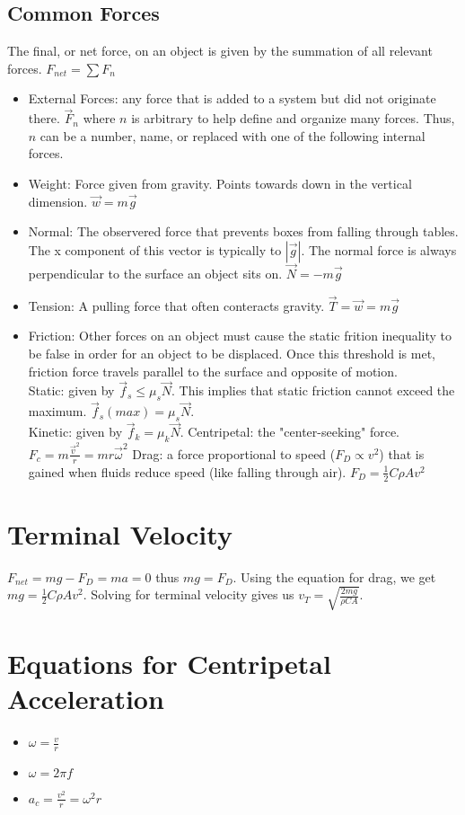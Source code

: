 \documentclass{article}
\begin{document}
\subsection{Common Forces}
The final, or net force, on an object is given by the summation of all relevant forces. $F_{net} = \sum F_n$
\begin{itemize}
  \item External Forces: any force that is added to a system but did not originate there. $\vec{F}_n$ where $n$ is arbitrary to help define and organize many forces. Thus, $n$ can be a number, name, or replaced with one of the following internal forces.
  \item Weight: Force given from gravity. Points towards down in the vertical dimension. $\vec{w} = m\vec{g}$
  \item Normal: The observered force that prevents boxes from falling through tables. The x component of this vector is typically to $|\vec{g}|$. The normal force is always perpendicular to the surface an object sits on. $\vec{N} = -m\vec{g}$
  \item Tension: A pulling force that often conteracts gravity. $\vec{T} = \vec{w} = m\vec{g}$
  \item Friction: Other forces on an object must cause the static frition inequality to be false in order for an object to be displaced. Once this threshold is met, friction force travels parallel to the surface and opposite of motion.\\
  Static: given by $\vec{f}_s \leq \mu_s\vec{N}$. This implies that static friction cannot exceed the maximum. $\vec{f}_s(max) = \mu_s\vec{N}$.\\
  Kinetic: given by $\vec{f}_k = \mu_k\vec{N}$.
  Centripetal: the "center-seeking" force. $F_c = m\frac{\vec{v}^2}{r} = mr\vec{\omega}^2$
  Drag: a force proportional to speed ($F_D \propto v^2$) that is gained when fluids reduce speed (like falling through air). $F_D = \frac{1}{2}C\rho Av^2$
\end{itemize}

\section{Terminal Velocity}
$F_{net} = mg - F_D = ma = 0$ thus $mg = F_D$. Using the equation for drag, we get $mg = \frac{1}{2}C\rho Av^2$. Solving for terminal velocity gives us $v_T = \sqrt{\frac{2mg}{\rho CA}}$.

\section{Equations for Centripetal Acceleration}
\begin{itemize}
  \item $\omega = \frac{v}{r}$
  \item $\omega = 2\pi f$
  \item $a_c = \frac{v^2}{r} = \omega^2 r$
\end{itemize}
\end{document}
